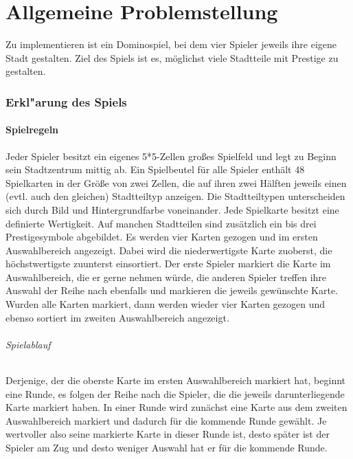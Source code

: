 \part{Allgemeine Problemstellung}
Zu implementieren ist ein Dominospiel, bei dem vier Spieler jeweils ihre eigene Stadt gestalten. Ziel des Spiels ist es, möglichst viele Stadtteile mit Prestige zu gestalten.
\cite{aufgabenstellung}

\section{Erkl"arung des Spiels}

\subsection{Spielregeln}
Jeder Spieler besitzt ein eigenes 5*5-Zellen großes Spielfeld und legt zu Beginn sein Stadtzentrum mittig ab.
Ein Spielbeutel für alle Spieler enthält 48 Spielkarten in der Größe von zwei Zellen, die auf ihren zwei Hälften jeweils einen (evtl. auch den gleichen) Stadtteiltyp anzeigen. Die Stadtteiltypen unterscheiden sich durch Bild und Hintergrundfarbe voneinander. Jede Spielkarte besitzt eine definierte Wertigkeit. Auf manchen Stadtteilen sind zusätzlich ein bis drei Prestigesymbole abgebildet.
Es werden vier Karten gezogen und im ersten Auswahlbereich angezeigt. Dabei wird die niederwertigste Karte zuoberst, die höchstwertigste zuunterst einsortiert. Der erste Spieler markiert die Karte im Auswahlbereich, die er gerne nehmen würde, die anderen Spieler treffen ihre Auswahl der Reihe nach ebenfalls und markieren die jeweils gewünschte Karte.
Wurden alle Karten markiert, dann werden wieder vier Karten gezogen und ebenso sortiert im zweiten Auswahlbereich angezeigt.


\paragraph{Spielablauf}
Derjenige, der die oberste Karte im ersten Auswahlbereich markiert hat, beginnt eine Runde, es folgen der Reihe nach die Spieler, die die jeweils darunterliegende Karte markiert haben. In einer Runde wird zunächst eine Karte aus dem zweiten Auswahlbereich markiert und dadurch für die kommende Runde gewählt. Je wertvoller also seine markierte Karte in dieser Runde ist, desto später ist der Spieler am Zug und desto weniger Auswahl hat er für die kommende Runde.


